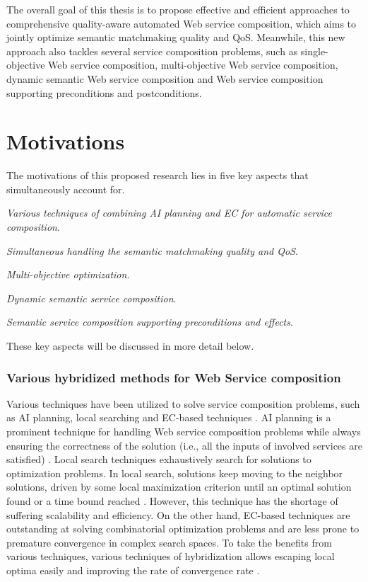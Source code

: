The overall goal of this thesis is to propose effective and efficient approaches to comprehensive quality-aware automated Web service composition, which aims to jointly optimize semantic matchmaking quality and QoS. Meanwhile, this new approach also tackles several service composition problems, such as single-objective Web service composition, multi-objective Web service composition, dynamic semantic Web service composition and Web service composition supporting preconditions and postconditions.

\section{Motivations}\label{C:motivation}
The motivations of this proposed research lies in five key aspects that simultaneously account for. 
\begin{enumerate*}
 \item \emph{Various techniques of combining AI planning and EC for automatic service composition}.
 \item \emph{Simultaneous handling the semantic matchmaking quality and QoS}.
 \item \emph{Multi-objective optimization}.
 \item \emph{Dynamic semantic service composition}.
 \item \emph{Semantic service composition supporting preconditions and effects}.
\end{enumerate*}
These key aspects will be discussed in more detail below.
\subsubsection{Various hybridized methods for Web Service composition}

Various techniques have been utilized to solve service composition problems, such as AI planning, local searching and EC-based techniques \cite{feng2013dynamic,parejo2008qos,qi2010combining,wang2014automated}. AI planning is a prominent technique for handling Web service composition problems while always ensuring the correctness of the solution (i.e., all the inputs of involved services are satisfied) \cite{wang2014automated}. Local search techniques exhaustively search for solutions to optimization problems. In local search, solutions keep moving to the neighbor solutions, driven by some local maximization criterion until an optimal solution found or a time bound reached \cite{parejo2008qos}. However, this technique has the shortage of suffering scalability and efficiency. On the other hand, EC-based techniques are outstanding at solving combinatorial optimization problems and are less prone to premature convergence in complex search spaces. To take the benefits from various techniques,  various techniques of hybridization allows escaping local optima easily and improving the rate of convergence rate \cite{renders1996hybrid}.

